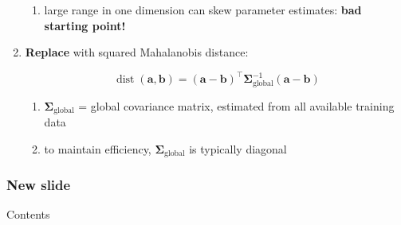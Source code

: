 \documentclass[usenames,dvipsnames]{beamer}
\def\Vec#1{{\boldsymbol{#1}}}
\def\Mat#1{{\boldsymbol{#1}}}
\begin{document}
\begin{frame}
\begin{enumerate}[{~~$\boldsymbol{\bullet}$}]
\begin{enumerate}[{$\boldsymbol{\rightarrow}$}]
\item
large range in one dimension can skew parameter estimates: {\bf bad starting point!}

\end{enumerate}
\vspace{0.5ex}

\item
{\bf Replace} with squared Mahalanobis distance:

\begin{equation*}
\operatorname{dist}(\Vec{a}, \Vec{b}) = (\Vec{a} - \Vec{b})^\top \Mat{\Sigma}^{-1}_{\mathrm{global}} (\Vec{a} - \Vec{b})
\end{equation*}

\begin{enumerate}[{$\boldsymbol{\rightarrow}$}]
\renewcommand{\itemsep}{0.9ex}

\item
$\Mat{\Sigma}_{\mathrm{global}}$ = global covariance matrix, estimated from all available training data

\item
to maintain efficiency, $\Mat{\Sigma}_{\mathrm{global}}$ is typically diagonal

\end{enumerate}



\end{enumerate}
\end{frame}







\begin{frame}
\frametitle{New slide}
Contents
\end{frame}





%  
%  
%  
\end{document}
